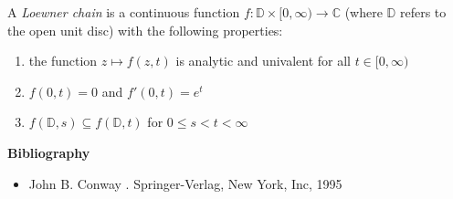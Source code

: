\documentclass[12pt]{article}
\begin{document}
A {\em Loewner chain} is a continuous function $f: {\mathbb{D}} \times [0,\infty)
\rightarrow {\mathbb{C}}$ (where ${\mathbb{D}}$ refers to the open unit disc) with the following properties:
\begin{enumerate}
\item
the function $z \mapsto f(z,t)$ is analytic and univalent for all $t \in [0,\infty)$
\item $f(0,t) = 0$ and $f'(0,t) = e^t$
\item $f({\mathbb{D}},s) \subseteq f({\mathbb{D}},t)$ for $0 \leq s < t < \infty$
\end{enumerate}

{\bf Bibliography}

\begin{itemize}
\item
John B. Conway  \emph{}.  Springer-Verlag, New York, Inc, 1995
\end{itemize}
\end{document}
